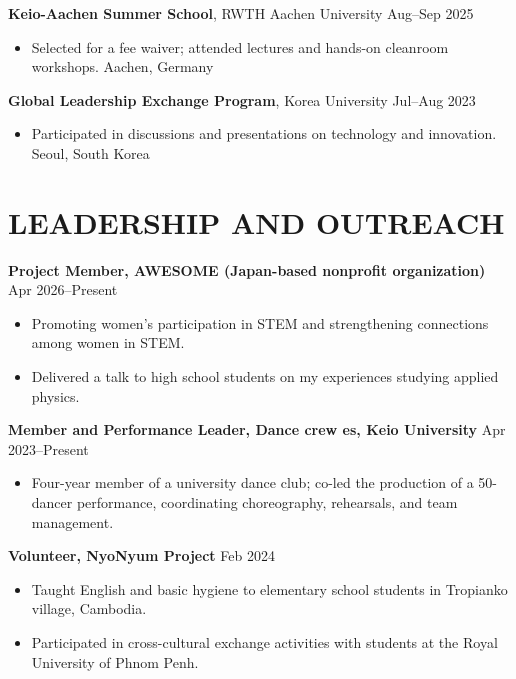 \documentclass[11pt]{article}
\begin{document}
\textbf{Keio-Aachen Summer School}, RWTH Aachen University
\hfill Aug--Sep 2025
\begin{itemize}
\item Selected for a fee waiver; attended lectures and hands-on cleanroom workshops. 
\hfill Aachen, Germany
\end{itemize}
\vspace{3pt}

\textbf{Global Leadership Exchange Program}, Korea University
\hfill Jul--Aug 2023
\begin{itemize}
\item Participated in discussions and presentations on technology and innovation.
\hfill Seoul, South Korea
\end{itemize}


\section*{LEADERSHIP AND OUTREACH}

\textbf{Project Member, AWESOME (Japan-based nonprofit organization)}
\hfill Apr 2026--Present
\begin{itemize}
    \item Promoting women's participation in STEM and strengthening connections among women in STEM.
    \item Delivered a talk to high school students on my experiences studying applied physics.
\end{itemize}
\vspace{3pt}

\textbf{Member and Performance Leader, Dance crew es, Keio University}
\hfill Apr 2023--Present
\begin{itemize}
    \item Four-year member of a university dance club; co-led
the production of a 50-dancer performance, coordinating
choreography, rehearsals, and team management.
\end{itemize}
\vspace{3pt}

\textbf{Volunteer, NyoNyum  Project}
\hfill Feb 2024
\begin{itemize}
    \item Taught English and basic hygiene to elementary school students in Tropianko village, Cambodia.
    \item Participated in cross-cultural exchange activities with students at the Royal University of Phnom Penh.
\end{itemize}
\end{document}

